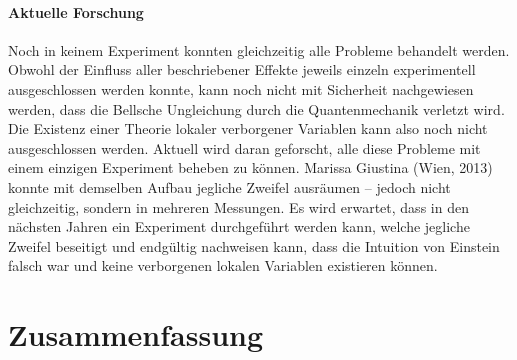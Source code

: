 \begin{refsection}
\paragraph{Aktuelle Forschung}
Noch in keinem Experiment konnten gleichzeitig alle Probleme behandelt werden.
Obwohl der Einfluss aller beschriebener Effekte jeweils einzeln experimentell
ausgeschlossen werden konnte, kann noch nicht mit Sicherheit nachgewiesen
werden, dass die Bellsche Ungleichung durch die Quantenmechanik verletzt wird.
Die Existenz einer Theorie lokaler verborgener Variablen kann also noch nicht
ausgeschlossen werden. 
Aktuell wird daran geforscht, alle diese Probleme mit einem einzigen Experiment
beheben zu k\"onnen. 
Marissa Giustina (Wien, 2013) \cite{Bell:Giustina2013} konnte mit demselben 
Aufbau jegliche Zweifel ausr\"aumen -- jedoch nicht gleichzeitig, sondern in 
mehreren Messungen.
Es wird erwartet, dass in den n\"achsten Jahren ein Experiment durchgef\"uhrt
werden kann, welche jegliche Zweifel beseitigt und endg\"ultig nachweisen
kann, dass die Intuition von Einstein falsch war und keine verborgenen
lokalen Variablen existieren k\"onnen.


\section{Zusammenfassung}


\printbibliography[heading=subbibliography]
\end{refsection}

